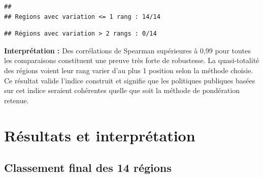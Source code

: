 \documentclass[
]{article}
\newenvironment{Shaded}{\begin{snugshade}}{\end{snugshade}}
\newcommand{\DecValTok}[1]{\textcolor[rgb]{0.00,0.00,0.81}{#1}}
\newcommand{\FunctionTok}[1]{\textcolor[rgb]{0.13,0.29,0.53}{\textbf{#1}}}
\newcommand{\NormalTok}[1]{#1}
\newcommand{\SpecialCharTok}[1]{\textcolor[rgb]{0.81,0.36,0.00}{\textbf{#1}}}
\newcommand{\StringTok}[1]{\textcolor[rgb]{0.31,0.60,0.02}{#1}}
\begin{document}
\begin{verbatim}
## 
## Regions avec variation <= 1 rang : 14/14
\end{verbatim}

\begin{Shaded}
\end{Shaded}

\begin{verbatim}
## Régions avec variation > 2 rangs : 0/14
\end{verbatim}

\textbf{Interprétation :} Des corrélations de Spearman supérieures à
0,99 pour toutes les comparaisons constituent une preuve très forte de
robustesse. La quasi-totalité des régions voient leur rang varier d'au
plus 1 position selon la méthode choisie. Ce résultat valide l'indice
construit et signifie que les politiques publiques basées sur cet indice
seraient cohérentes quelle que soit la méthode de pondération retenue.

\newpage

\section{Résultats et
interprétation}\label{ruxe9sultats-et-interpruxe9tation}

\subsection{Classement final des 14
régions}\label{classement-final-des-14-ruxe9gions}
\end{document}
